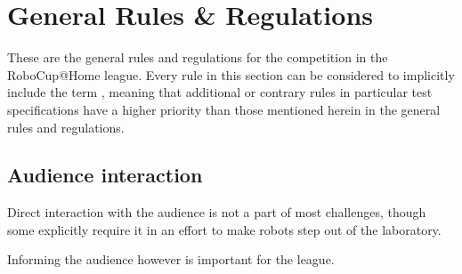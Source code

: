 \chapter{General Rules \& Regulations}
\label{chap:rules}

These are the general rules and regulations for the competition in the RoboCup@Home league.
Every rule in this section can be considered to implicitly include the 
term \emph{}, meaning that additional or contrary rules in particular
test specifications have a higher priority than those mentioned herein in the general rules and regulations.  



\section{Audience interaction}
Direct interaction with the audience is not a part of most challenges, though some explicitly require it in an effort to make robots step out of the laboratory. 

Informing the audience however is important for the league. 























